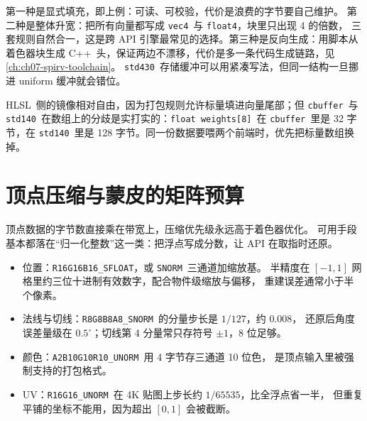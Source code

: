 \documentclass[12pt,a4paper,fontset=fandol]{ctexbook}
\newcommand{\Tp}[1]{\texttt{#1}}
\newcommand{\Lang}[1]{\textsf{#1}}
\newcommand{\CPP}{\Lang{C++}}
\newcommand{\HSL}{\Lang{HLSL}}
\begin{document}
\begin{note}[title={三种镜像策略的取舍}]
  第一种是显式填充，即上例：可读、可校验，代价是浪费的字节要自己维护。
  第二种是整体升宽：把所有向量都写成 \Tp{vec4}\ 与 \Tp{float4}，块里只出现 4 的倍数，
  三套规则自然合一，这是跨 API 引擎最常见的选择。第三种是反向生成：用脚本从着色器块生成
  \CPP\ 头，保证两边不漂移，代价是多一条代码生成链路，见 \ref{ch:ch07-spirv-toolchain}。
  \Tp{std430}\ 存储缓冲可以用紧凑写法，但同一结构一旦挪进 uniform 缓冲就会错位。
\end{note}

\HSL\ 侧的镜像相对自由，因为打包规则允许标量填进向量尾部；但 \Tp{cbuffer}\ 与
\Tp{std140}\ 在数组上的分歧是实打实的：\Tp{float weights[8]}\ 在 \Tp{cbuffer}\ 里是
32 字节，在 \Tp{std140}\ 里是 128 字节。同一份数据要喂两个前端时，优先把标量数组换掉。

\section{顶点压缩与蒙皮的矩阵预算}
\label{sec:ch03-compress}

顶点数据的字节数直接乘在带宽上，压缩优先级永远高于着色器优化。
可用手段基本都落在``归一化整数''这一类：把浮点写成分数，让 API 在取指时还原。

\begin{itemize}
  \item 位置：\Tp{R16G16B16\_SFLOAT}，或 \Tp{SNORM}\ 三通道加缩放基。
        半精度在 $[-1,1]$ 网格里约三位十进制有效数字，配合物件级缩放与偏移，
        重建误差通常小于半个像素。
  \item 法线与切线：\Tp{R8G8B8A8\_SNORM}\ 的分量步长是 $1/127$，约 $0.008$，
        还原后角度误差量级在 $0.5^\circ$；切线第 4 分量常只存符号 $\pm 1$，8 位足够。
  \item 颜色：\Tp{A2B10G10R10\_UNORM}\ 用 4 字节存三通道 10 位色，
        是顶点输入里被强制支持的打包格式。
  \item UV：\Tp{R16G16\_UNORM}\ 在 4K 贴图上步长约 $1/65535$，比全浮点省一半，
        但重复平铺的坐标不能用，因为超出 $[0,1]$ 会被截断。
\end{itemize}
\end{document}
